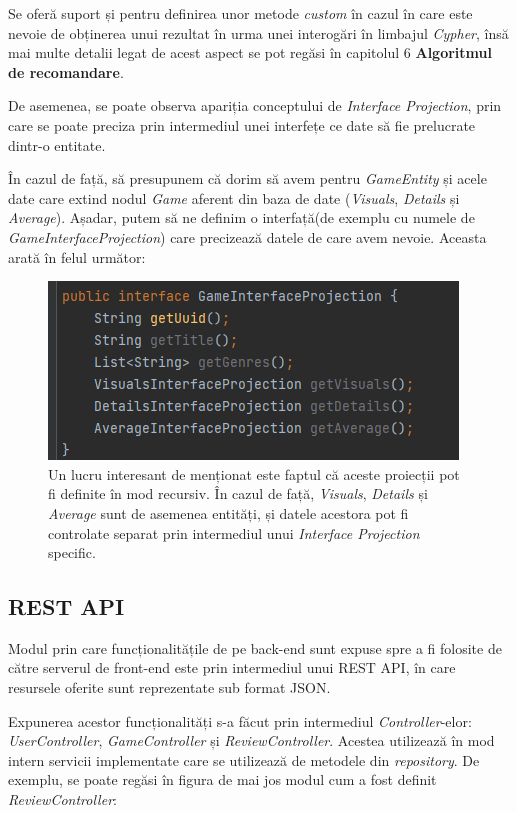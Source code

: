 \documentclass[12pt,a4paper]{report}
\begin{document}
Se oferă suport și pentru definirea unor metode \emph{custom} în cazul în care este nevoie de obținerea unui rezultat în urma unei interogări în limbajul \emph{Cypher}, însă mai multe detalii legat de acest aspect se pot regăsi în capitolul 6 \textbf{Algoritmul de recomandare}.

De asemenea, se poate observa apariția conceptului de \emph{Interface Projection}, prin care se poate preciza prin intermediul unei interfețe ce date să fie prelucrate dintr-o entitate. 

În cazul de față, să presupunem că dorim să avem pentru \emph{GameEntity} și acele date care extind nodul \emph{Game} aferent din baza de date (\emph{Visuals}, \emph{Details} și \emph{Average}). Așadar, putem să ne definim o interfață(de exemplu cu numele de \emph{GameInterfaceProjection}) care precizează datele de care avem nevoie. Aceasta arată în felul următor:

\begin{figure}[H]
\centering
\caption{}
\includegraphics[scale = 1]{exemplu_20_interface_projection}
\caption*{Un lucru interesant de menționat este faptul că aceste proiecții pot fi definite în mod recursiv. În cazul de față, \emph{Visuals}, \emph{Details} și \emph{Average} sunt de asemenea entități, și datele acestora pot fi controlate separat prin intermediul unui \emph{Interface Projection} specific.}
\end{figure}


\subsection{REST API}

Modul prin care funcționalitățile de pe back-end sunt expuse spre a fi folosite de către serverul de front-end este prin intermediul unui REST API, în care resursele oferite sunt reprezentate sub format JSON.

Expunerea acestor funcționalități s-a făcut prin intermediul \emph{Controller}-elor: \emph{UserController}, \emph{GameController} și \emph{ReviewController}. Acestea utilizează în mod intern servicii implementate care se utilizează de metodele din \emph{repository}. De exemplu, se poate regăsi în figura de mai jos modul cum a fost definit \emph{ReviewController}:
\end{document}
